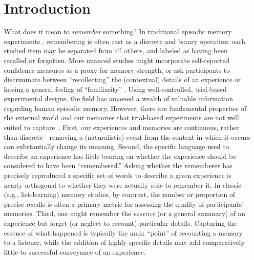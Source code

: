 \documentclass{article}
\begin{document}
\section*{Introduction}
What does it mean to \textit{remember} something? In traditional episodic memory experiments \citep[e.g., list-learning or trial-based experiments;][]{Murd62a, Kaha96}, remembering is often cast as a discrete and binary operation: each studied item may be separated from all others, and labeled as having been recalled or forgotten. More nuanced studies might incorporate self-reported confidence measures as a proxy for memory strength, or ask participants to discriminate between ``recollecting'' the (contextual) details of an experience or having a general feeling of ``familiarity'' \citep{Yone02}. Using well-controlled, trial-based experimental designs, the field has amassed a wealth of valuable information regarding human episodic memory.  However, there are fundamental properties of the external world and our memories that trial-based experiments are not well suited to capture~\citep[for review also see][]{KoriGold94, HukEtal18}.  First, our experiences and memories are continuous, rather than discrete---removing a (naturalistic) event from the context in which it occurs can substantially change its meaning.  Second, the specific language used to describe an experience has little bearing on whether the experience should be considered to have been ``remembered.''  Asking whether the rememberer has precisely reproduced a specific set of words to describe a given experience is nearly orthogonal to whether they were actually able to remember it.  In classic (e.g., list-learning) memory studies, by contrast, the number or proportion of precise recalls is often a primary metric for assessing the quality of participants' memories.  Third, one might remember the \textit{essence} (or a general summary) of an experience but forget (or neglect to recount) particular details.  Capturing the essence of what happened is typically the main ``point'' of recounting a memory to a listener, while the addition of highly specific details may add comparatively little to successful conveyance of an experience.
\end{document}
